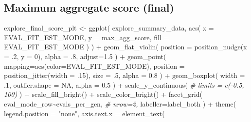 \documentclass[
]{book}
\newenvironment{Shaded}{\begin{snugshade}}{\end{snugshade}}
\newcommand{\AttributeTok}[1]{\textcolor[rgb]{0.77,0.63,0.00}{#1}}
\newcommand{\CommentTok}[1]{\textcolor[rgb]{0.56,0.35,0.01}{\textit{#1}}}
\newcommand{\ConstantTok}[1]{\textcolor[rgb]{0.00,0.00,0.00}{#1}}
\newcommand{\DecValTok}[1]{\textcolor[rgb]{0.00,0.00,0.81}{#1}}
\newcommand{\FloatTok}[1]{\textcolor[rgb]{0.00,0.00,0.81}{#1}}
\newcommand{\FunctionTok}[1]{\textcolor[rgb]{0.00,0.00,0.00}{#1}}
\newcommand{\NormalTok}[1]{#1}
\newcommand{\OtherTok}[1]{\textcolor[rgb]{0.56,0.35,0.01}{#1}}
\newcommand{\SpecialCharTok}[1]{\textcolor[rgb]{0.00,0.00,0.00}{#1}}
\newcommand{\StringTok}[1]{\textcolor[rgb]{0.31,0.60,0.02}{#1}}
\begin{document}
\hypertarget{maximum-aggregate-score-final}{%
\subsection{Maximum aggregate score (final)}\label{maximum-aggregate-score-final}}

\begin{Shaded}
\begin{Highlighting}[]
\NormalTok{explore\_final\_score\_plt }\OtherTok{\textless{}{-}} \FunctionTok{ggplot}\NormalTok{(}
\NormalTok{    explore\_summary\_data,}
    \FunctionTok{aes}\NormalTok{(}
      \AttributeTok{x =}\NormalTok{ EVAL\_FIT\_EST\_MODE,}
      \AttributeTok{y =}\NormalTok{ max\_agg\_score,}
      \AttributeTok{fill =}\NormalTok{ EVAL\_FIT\_EST\_MODE}
\NormalTok{    )}
\NormalTok{  ) }\SpecialCharTok{+}
  \FunctionTok{geom\_flat\_violin}\NormalTok{(}
    \AttributeTok{position =} \FunctionTok{position\_nudge}\NormalTok{(}\AttributeTok{x =}\NormalTok{ .}\DecValTok{2}\NormalTok{, }\AttributeTok{y =} \DecValTok{0}\NormalTok{),}
    \AttributeTok{alpha =}\NormalTok{ .}\DecValTok{8}\NormalTok{,}
    \AttributeTok{adjust=}\FloatTok{1.5}
\NormalTok{  ) }\SpecialCharTok{+}
  \FunctionTok{geom\_point}\NormalTok{(}
    \AttributeTok{mapping=}\FunctionTok{aes}\NormalTok{(}\AttributeTok{color=}\NormalTok{EVAL\_FIT\_EST\_MODE),}
    \AttributeTok{position =} \FunctionTok{position\_jitter}\NormalTok{(}\AttributeTok{width =}\NormalTok{ .}\DecValTok{15}\NormalTok{),}
    \AttributeTok{size =}\NormalTok{ .}\DecValTok{5}\NormalTok{,}
    \AttributeTok{alpha =} \FloatTok{0.8}
\NormalTok{  ) }\SpecialCharTok{+}
  \FunctionTok{geom\_boxplot}\NormalTok{(}
    \AttributeTok{width =}\NormalTok{ .}\DecValTok{1}\NormalTok{,}
    \AttributeTok{outlier.shape =} \ConstantTok{NA}\NormalTok{,}
    \AttributeTok{alpha =} \FloatTok{0.5}
\NormalTok{  ) }\SpecialCharTok{+}
  \FunctionTok{scale\_y\_continuous}\NormalTok{(}
    \CommentTok{\# limits = c({-}0.5, 100)}
\NormalTok{  ) }\SpecialCharTok{+}
  \FunctionTok{scale\_fill\_bright}\NormalTok{() }\SpecialCharTok{+}
  \FunctionTok{scale\_color\_bright}\NormalTok{() }\SpecialCharTok{+}
  \FunctionTok{facet\_grid}\NormalTok{(}
\NormalTok{    eval\_mode\_row}\SpecialCharTok{\textasciitilde{}}\NormalTok{evals\_per\_gen,}
    \CommentTok{\# nrow=2,}
    \AttributeTok{labeller=}\NormalTok{label\_both}
\NormalTok{  ) }\SpecialCharTok{+}
  \FunctionTok{theme}\NormalTok{(}
    \AttributeTok{legend.position =} \StringTok{"none"}\NormalTok{,}
    \AttributeTok{axis.text.x =} \FunctionTok{element\_text}\NormalTok{(}

\end{Highlighting}
\end{Shaded}
\end{document}
